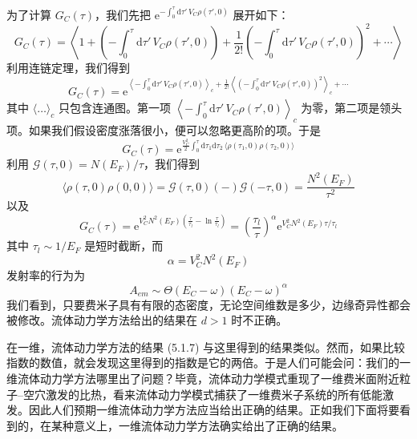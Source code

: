 为了计算 $G_C(\tau)$，我们先把 $\mathrm{e}^{-\int_0^{\tau}\mathrm{d}\tau'\,V_C\rho(\tau',0)}$ 展开如下：
\begin{equation*}
G_C(\tau)=\left\langle 1+\left(-\int_0^{\tau}\mathrm{d}\tau'\,V_C\rho(\tau',0)\right)+\frac{1}{2!}\left(-\int_0^{\tau}\mathrm{d}\tau'\,V_C\rho(\tau',0)\right)^2+\cdots\right\rangle
\end{equation*}
利用连链定理，我们得到
\begin{equation*}
G_C(\tau)=\mathrm{e}^{\left\langle-\int_0^{\tau}\mathrm{d}\tau'\,V_C\rho(\tau',0)\right\rangle_c+\frac{1}{2!}\left\langle\left(-\int_0^{\tau}\mathrm{d}\tau'\,V_C\rho(\tau',0)\right)^2\right\rangle_c+\cdots}
\end{equation*}
其中 $\langle\ldots\rangle_c$ 只包含连通图。第一项 $\left\langle-\int_0^{\tau}\mathrm{d}\tau'\,V_C\rho(\tau',0)\right\rangle_c$ 为零，第二项是领头项。如果我们假设密度涨落很小，便可以忽略更高阶的项。于是
\begin{equation*}
G_C(\tau)=\mathrm{e}^{\frac{V_C^2}{2}\int_0^{\tau}\mathrm{d}\tau_1\mathrm{d}\tau_2\,\langle\rho(\tau_1,0)\rho(\tau_2,0)\rangle}
\end{equation*}
利用 $\mathcal{G}(\tau,0)=N(E_F)/\tau$，我们得到
\begin{equation*}
\langle\rho(\tau,0)\rho(0,0)\rangle=\mathcal{G}(\tau,0)(-)\mathcal{G}(-\tau,0)=\frac{N^2(E_F)}{\tau^2}
\end{equation*}
以及
\begin{equation*}
G_C(\tau)=\mathrm{e}^{V_C^2N^2(E_F)\left(\frac{\tau}{\tau_l}-\ln\frac{\tau}{\tau_l}\right)}=\left(\frac{\tau_l}{\tau}\right)^{\alpha}\mathrm{e}^{V_C^2N^2(E_F)\tau/\tau_l}
\end{equation*}
其中 $\tau_l\sim 1/E_F$ 是短时截断，而
\begin{equation*}
\alpha=V_C^2N^2(E_F)
\end{equation*}
发射率的行为为
\begin{equation*}
A_{em}\sim\Theta(E_C-\omega)(E_C-\omega)^{\alpha}
\end{equation*}
我们看到，只要费米子具有有限的态密度，无论空间维数是多少，边缘奇异性都会被修改。流体动力学方法给出的结果在 $d>1$ 时不正确。

在一维，流体动力学方法的结果 (5.1.7) 与这里得到的结果类似。然而，如果比较指数的数值，就会发现这里得到的指数是它的两倍。于是人们可能会问：我们的一维流体动力学方法哪里出了问题？毕竟，流体动力学模式重现了一维费米面附近粒子--空穴激发的比热，看来流体动力学模式捕获了一维费米子系统的所有低能激发。因此人们预期一维流体动力学方法应当给出正确的结果。正如我们下面将要看到的，在某种意义上，一维流体动力学方法确实给出了正确的结果。

